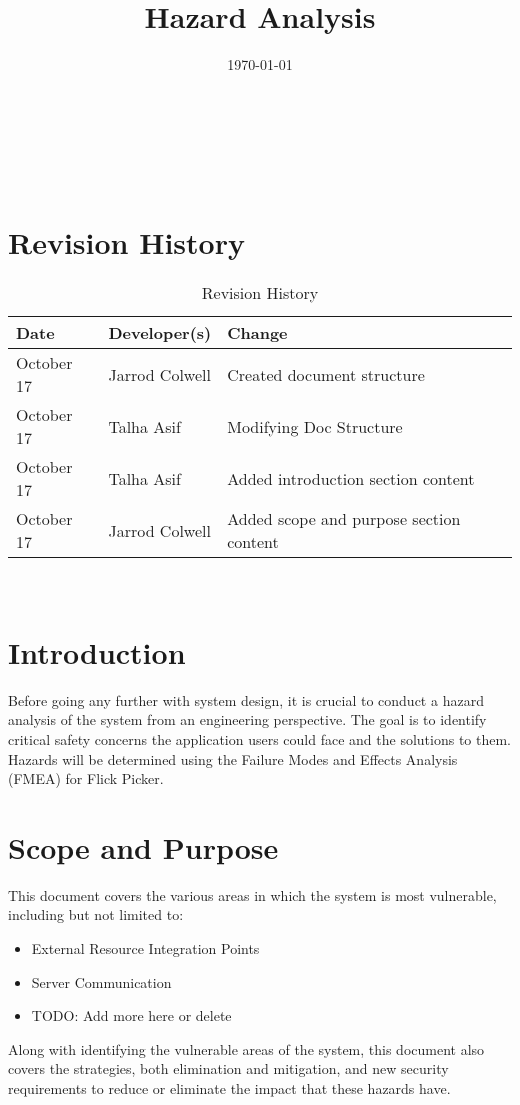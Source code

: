 \documentclass[12pt]{article}
\title{Hazard Analysis\\\progname}
\author{\authname}
\date{\today}
\begin{document}
\maketitle

~\newpage {}

\tableofcontents

~\newpage

\section*{Revision History}
\begin{table}[hp]
	\caption{Revision History} \label{TblRevisionHistory}
	\begin{tabularx}{\textwidth}{llX}
		\toprule
		\textbf{Date} & \textbf{Developer(s)} & \textbf{Change}\\
		\midrule
		October 17 & Jarrod Colwell & Created document structure\\
		October 17 & Talha Asif & Modifying Doc Structure\\
		October 17 & Talha Asif & Added introduction section content\\
		October 17 & Jarrod Colwell & Added scope and purpose section content\\
		\bottomrule
		\end{tabularx}
\end{table}

~\newpage {}

\section{Introduction}
Before going any further with system design, it is crucial to conduct a hazard analysis of the system from an engineering perspective. The goal is to identify critical safety concerns the application users could face and the solutions to them. Hazards will be determined using the Failure Modes and Effects Analysis (FMEA) for Flick Picker.

\section{Scope and Purpose}
This document covers the various areas in which the system is most vulnerable, including but not limited to:
\begin{itemize}
	\item External Resource Integration Points
	\item Server Communication
	\item TODO: Add more here or delete
\end{itemize}
Along with identifying the vulnerable areas of the system, this document also covers the strategies, both elimination and mitigation, and new security requirements to reduce or eliminate the impact that these hazards have.
\end{document}
